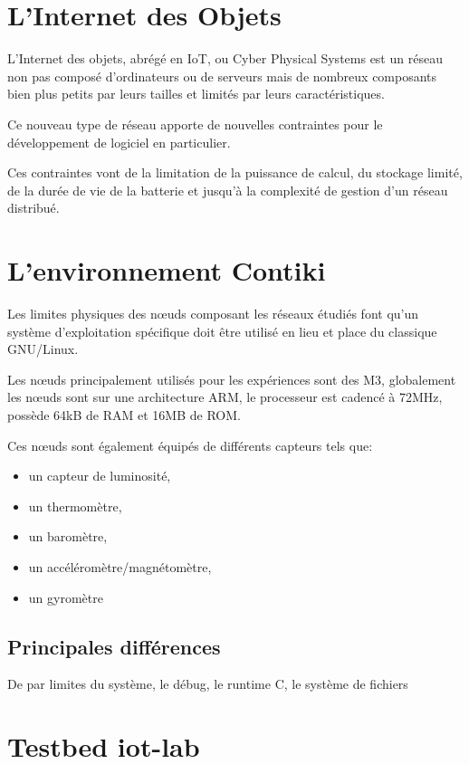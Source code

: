 \section{L'Internet des Objets}

L'Internet des objets, abrégé en IoT, ou Cyber Physical Systems est un réseau non pas composé d'ordinateurs ou de serveurs mais de nombreux composants bien plus petits par leurs tailles et limités par leurs caractéristiques.

Ce nouveau type de réseau apporte de nouvelles contraintes pour le développement de logiciel en particulier.

Ces contraintes vont de la limitation de la puissance de calcul, du stockage limité, de la durée de vie de la batterie et jusqu'à la complexité de gestion d'un réseau distribué.

\section{L'environnement Contiki}

Les limites physiques des nœuds composant les réseaux étudiés font qu'un système d'exploitation spécifique doit être utilisé en lieu et place du classique GNU/Linux.


Les nœuds principalement utilisés pour les expériences sont des M3, globalement les nœuds sont sur une architecture ARM, le processeur est cadencé à 72MHz, possède 64kB de RAM et 16MB de ROM.

Ces nœuds sont également équipés de différents capteurs tels que:
\begin{itemize}
\item un capteur de luminosité,
\item un thermomètre,
\item un baromètre,
\item un accéléromètre/magnétomètre,
\item un gyromètre
\end{itemize}

\subsection{Principales différences}

De par 
limites du système, le débug, le runtime C, le système de fichiers


\section{Testbed iot-lab}


